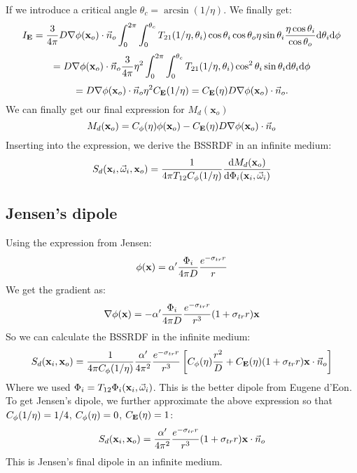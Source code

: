 \documentclass[10pt,a4paper]{article}
\begin{document}
If we introduce a critical angle $\theta_c = \arcsin(1/\eta)$. We finally get:
$$
I_{\mathbf{E}} = \frac{3}{4\pi} D \nabla\phi(\mathbf{x}_o) \cdot \vec{n}_o \int_{0}^{2\pi}\int_{0}^{\theta_c} T_{21}(1/\eta,\theta_i) \cos\theta_i \cos \theta_o \eta \sin \theta_i \frac{\eta \cos\theta_i}{\cos\theta_o} \text{d} \theta_i \text{d} \phi
$$
$$
= D \nabla\phi(\mathbf{x}_o) \cdot \vec{n}_o \frac{3}{4\pi} \eta^2 \int_{0}^{2\pi}\int_{0}^{\theta_c} T_{21}(1/\eta,\theta_i) \cos^2\theta_i \sin \theta_i \text{d} \theta_i \text{d} \phi 
$$
$$
= D \nabla\phi(\mathbf{x}_o) \cdot \vec{n}_o \eta^2 C_{\mathbf{E}}(1/\eta) = C_{\mathbf{E}}(\eta) D \nabla\phi(\mathbf{x}_o) \cdot \vec{n}_o. 
$$
We can finally get our final expression for  $M_d(\mathbf{x}_o)$
$$
M_d(\mathbf{x}_o) =  C_{\phi}(\eta) \phi(\mathbf{x}_o) - C_{\mathbf{E}}(\eta) D \nabla\phi(\mathbf{x}_o) \cdot \vec{n}_o
$$
Inserting into the expression, we derive the BSSRDF in an infinite medium:
$$
S_d(\mathbf{x}_i, \vec{\omega}_i, \mathbf{x}_o)  =  \frac{1}{4\pi T_{12}C_{\phi}(1/\eta)} \frac{\text{d} M_d(\mathbf{x}_o)}{\text{d} \Phi_i(\mathbf{x}_i, \vec{\omega}_i)} 
$$
\subsection{Jensen's dipole}
Using the expression from Jensen:
$$
{\phi}(\mathbf{x}) = \alpha' \frac{\Phi_i}{4 \pi D} \frac{e^{-\sigma_{tr} r}}{r}
$$
We get the gradient as:
$$
\nabla {\phi}(\mathbf{x}) =  -\alpha'\frac{\Phi_i}{4 \pi D} \frac{e^{-\sigma_{tr} r}}{r^3} (1 + \sigma_{tr} r) \mathbf{x}
$$
So we can calculate the BSSRDF in the infinite medium:
$$
S_d(\mathbf{x}_i, \mathbf{x}_o)  = \frac{1}{4\pi C_{\phi}(1/\eta)} \frac{\alpha'}{4 \pi^2} \frac{e^{-\sigma_{tr} r}}{r^3} \left[ C_{\phi}(\eta) \frac{r^2}{D} + C_{\mathbf{E}}(\eta) (1 + \sigma_{tr} r) \mathbf{x} \cdot \vec{n}_o \right]
$$
Where we used $\Phi_i = T_{12} \Phi_i(\mathbf{x}_i, \vec{\omega}_i)$. This is the better dipole from Eugene d'Eon. To get Jensen's dipole, we further approximate the above expression so that $C_{\phi}(1/\eta) = 1/4$, $C_{\phi}(\eta) = 0$, $ C_{\mathbf{E}}(\eta) = 1$:
$$
S_d(\mathbf{x}_i, \mathbf{x}_o)  =  \frac{\alpha'}{4 \pi^2} \frac{e^{-\sigma_{tr} r}}{r^3} (1 + \sigma_{tr} r) \mathbf{x} \cdot \vec{n}_o 
$$
This is Jensen's final dipole in an infinite medium.
\end{document}
